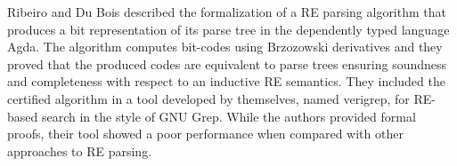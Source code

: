 \documentclass[oneside,12pt]{scrbook}
\theoremstyle{definition}
\theoremstyle{plain}
\theoremstyle{definition}
\begin{document}

Ribeiro and Du Bois \cite{Ribeiro2017} described the formalization of a RE parsing algorithm that produces a bit representation of its parse tree in the dependently typed language Agda. The algorithm computes bit-codes using Brzozowski derivatives and they proved that the produced codes are equivalent to parse trees ensuring soundness and completeness with respect to an inductive RE semantics. They included the certified algorithm in a tool developed by themselves, named verigrep, for RE-based search in the style of GNU Grep. While the authors provided formal proofs, their tool showed a poor performance when compared with other approaches to RE parsing. %


\end{document}
